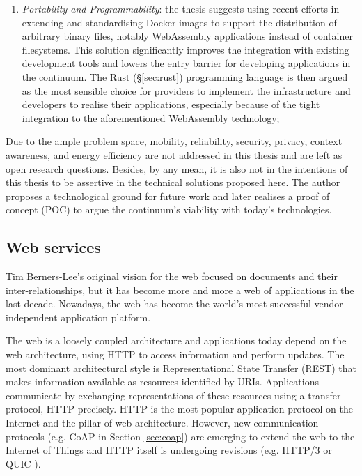 \begin{enumerate}
    \item \emph{Portability and Programmability}: the thesis suggests using recent efforts in extending and standardising Docker images to support the distribution of arbitrary binary files, notably WebAssembly applications instead of container filesystems. This solution significantly improves the integration with existing development tools and lowers the entry barrier for developing applications in the continuum. The Rust (§\ref{sec:rust}) programming language is then argued as the most sensible choice for providers to implement the infrastructure and developers to realise their applications, especially because of the tight integration to the aforementioned WebAssembly technology;
\end{enumerate}

Due to the ample problem space, mobility, reliability, security, privacy, context awareness, and energy efficiency are not addressed in this thesis and are left as open research questions. Besides, by any mean, it is also not in the intentions of this thesis to be assertive in the technical solutions proposed here. The author proposes a technological ground for future work and later realises a proof of concept (POC) to argue the continuum's viability with today's technologies.

\subsection{Web services}
\label{sec:web}

Tim Berners-Lee's original vision for the web focused on documents and their inter-relationships, but it has become more and more a web of applications in the last decade. Nowadays, the web has become the world's most successful vendor-independent application platform.

The web is a loosely coupled architecture and applications today depend on the web architecture, using HTTP to access information and perform updates. The most dominant architectural style is Representational State Transfer (REST) \cite{rest} that makes information available as resources identified by URIs. Applications communicate by exchanging representations of these resources using a transfer protocol, HTTP precisely. HTTP is the most popular application protocol on the Internet and the pillar of web architecture. However, new communication protocols (e.g. CoAP in Section \ref{sec:coap}) are emerging to extend the web to the Internet of Things and HTTP itself is undergoing revisions (e.g. HTTP/3 or QUIC \cite{quic}).

